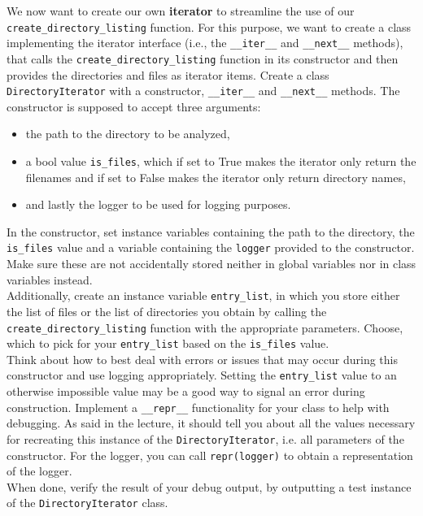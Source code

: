 \documentclass[]{erlangen-problemset}
\begin{document}
\begin{problem}[title={Iterators}]
\noindent
We now want to create our own \textbf{iterator} to streamline the use of our \texttt{create\_directory\_listing} function.
For this purpose, we want to create a class implementing the iterator interface (i.e., the \texttt{\_\_iter\_\_} and \texttt{\_\_next\_\_} methods), that calls the \texttt{create\_directory\_listing} function in its constructor and then provides the directories and files as iterator items.
\Question Create a class \texttt{DirectoryIterator} with a constructor, \texttt{\_\_iter\_\_} and \texttt{\_\_next\_\_} methods. 
The constructor is supposed to accept three arguments: 
\begin{itemize}
	\item the path to the directory to be analyzed, 
	\item a bool value \texttt{is\_files}, which if set to True makes the iterator only return the filenames and if set to False makes the iterator only return directory names, 
	\item and lastly the logger to be used for logging purposes.
\end{itemize}
In the constructor, set instance variables containing the path to the directory, the \texttt{is\_files} value and a variable containing the \texttt{logger} provided to the constructor. 
Make sure these are not accidentally stored neither in global variables nor in class variables instead.\\
Additionally, create an instance variable \texttt{entry\_list}, in which you store either the list of files or the list of directories you obtain by calling the \texttt{create\_directory\_listing} function with the appropriate parameters. 
Choose, which to pick for your \texttt{entry\_list} based on the \texttt{is\_files} value.\\
Think about how to best deal with errors or issues that may occur during this constructor and use logging appropriately. 
Setting the \texttt{entry\_list} value to an otherwise impossible value may be a good way to signal an error during construction.
\Question Implement a \texttt{\_\_repr\_\_} functionality for your class to help with debugging. 
As said in the lecture, it should tell you about all the values necessary for recreating this instance of the \texttt{DirectoryIterator}, i.e. all parameters of the constructor. 
For the logger, you can call \texttt{repr(logger)} to obtain a representation of the logger.\\
When done, verify the result of your debug output, by outputting a test instance of the \texttt{DirectoryIterator} class.

\end{problem}
\end{document}

